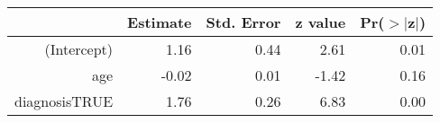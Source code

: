 \begin{table}[ht]
\centering
\begin{tabular}{rrrrr}
  \hline
 & Estimate & Std. Error & z value & Pr($>$$|$z$|$) \\ 
  \hline
(Intercept) & 1.16 & 0.44 & 2.61 & 0.01 \\ 
  age & -0.02 & 0.01 & -1.42 & 0.16 \\ 
  diagnosisTRUE & 1.76 & 0.26 & 6.83 & 0.00 \\ 
   \hline
\end{tabular}
\end{table}
